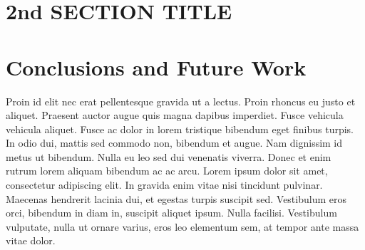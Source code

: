 \documentclass[]{article}
\begin{document}
	\pagebreak
	\begin{multicols}{2}
	
	\section{2nd SECTION TITLE}

	\section{Conclusions and Future Work}
	Proin id elit nec erat pellentesque gravida ut a lectus. Proin rhoncus eu justo et aliquet. Praesent auctor augue quis magna dapibus imperdiet. Fusce vehicula vehicula aliquet. Fusce ac dolor in lorem tristique bibendum eget finibus turpis. In odio dui, mattis sed commodo non, bibendum et augue. Nam dignissim id metus ut bibendum. Nulla eu leo sed dui venenatis viverra. Donec et enim rutrum lorem aliquam bibendum ac ac arcu. Lorem ipsum dolor sit amet, consectetur adipiscing elit. In gravida enim vitae nisi tincidunt pulvinar. Maecenas hendrerit lacinia dui, et egestas turpis suscipit sed. Vestibulum eros orci, bibendum in diam in, suscipit aliquet ipsum. Nulla facilisi. Vestibulum vulputate, nulla ut ornare varius, eros leo elementum sem, at tempor ante massa vitae dolor.	




	
\end{multicols}
\end{document}
